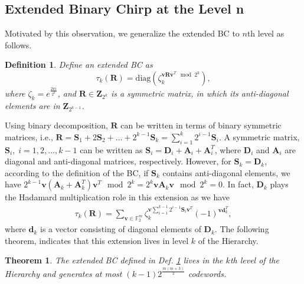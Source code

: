 \documentclass[lettersize,journal,onecolumn]{IEEEtran}
\newtheorem{theorem}{Theorem}
\newtheorem{definition}{Definition}
\begin{document}
\subsection{Extended Binary Chirp at the Level n}
Motivated by this observation, we generalize the extended BC to $n$th level as follows.
\begin{definition}\label{DefExtend2}
	Define an extended BC as
	\begin{equation}\label{DiagDefGen}
		\tau_k\left(\mathbf{R}\right) = \text{diag}\left(\zeta_k^{\mathbf{vRv}^T\mod 2^k}\right),
	\end{equation}
where $\zeta_k = e^{\frac{2\pi i}{2^k}}$, and $\mathbf{R} \in \mathbf{Z}_{2^k}$ is a symmetric matrix, in which its anti-diagonal elements are in $\mathbf{Z}_{2^{k-1}}$.
\end{definition}
Using binary decomposition, $\mathbf{R}$ can be written in terms of binary symmetric matrices, i.e., $\mathbf{R}=\mathbf{S}_1+2\mathbf{S}_2+...+2^{k-1}\mathbf{S}_k = \sum_{i=1}^{k}{2^{i-1}\mathbf{S}_i}$. A symmetric matrix, $\mathbf{S}_i, \; i=1,2,...,k-1$ can be written as $\mathbf{S}_i = \mathbf{D}_i+\mathbf{A}_i+\mathbf{A}_i^T$, where $\mathbf{D}_i$ and $\mathbf{A}_i$ are diagonal and anti-diagonal matrices, respectively. However, for $\mathbf{S}_{k}=\mathbf{D}_k$, according to the definition of the BC, if $\mathbf{S}_{k}$ contains anti-diagonal elements, we have $2^{k-1}\mathbf{v} \left(\mathbf{A}_k + \mathbf{A}_k^T\right) \mathbf{v}^T \mod 2^k = 2^k \mathbf{v}\mathbf{A}_k \mathbf{v} \mod 2^k = 0$. In fact, $\mathbf{D}_k$ plays the Hadamard multiplication role in this extension as we have
\begin{align}
	\tau_k\left(\mathbf{R}\right) = \sum_{\mathbf{v}\in \mathbb{F}_2^m}{\zeta_k^{\mathbf{v}\sum_{i=1}^{k-1}{2^{i-1}\mathbf{S}_i } \mathbf{v}^T } (-1)^{\mathbf{v}\mathbf{d}_k^T} },
\end{align} 
where $\mathbf{d}_k$ is a vector consisting of diagonal elements of $\mathbf{D}_k$. The following theorem, indicates that this extension lives in level $k$ of the Hierarchy. 
\begin{theorem}
	The extended BC defined in Def. \ref{DefExtend2} lives in the $k$th level of the Hierarchy and generates at most $\left(k-1\right)2^{\frac{m\left(m+3\right) }{2} }$ codewords.
\end{theorem}
\end{document}
